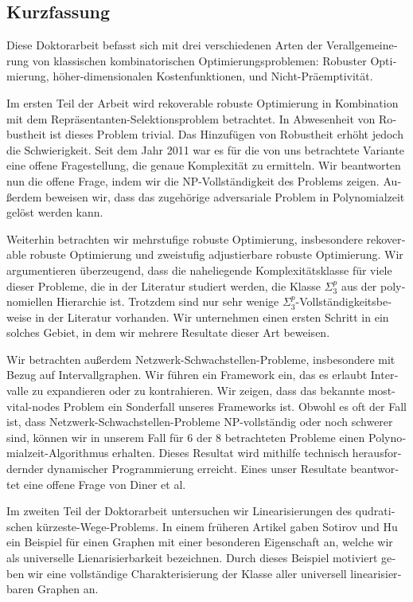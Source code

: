 \documentclass[twoside,openright,bibliography=totoc]{scrreprt}
\begin{document}
\begin{otherlanguage}{ngerman}
\chapter*{Kurzfassung}

Diese Doktorarbeit befasst sich mit drei verschiedenen Arten der Verallgemeinerung von klassischen kombinatorischen Optimierungsproblemen: Robuster Optimierung, höher-dimensionalen Kostenfunktionen, und Nicht-Präemptivität.


Im ersten Teil der Arbeit wird rekoverable robuste Optimierung in Kombination mit dem Repräsentanten-Selektionsproblem betrachtet. 
In Abwesenheit von Robustheit ist dieses Problem trivial. 
Das Hinzufügen von Robustheit erhöht jedoch die Schwierigkeit. 
Seit dem Jahr 2011 war es für die von uns betrachtete Variante eine offene Fragestellung, die genaue Komplexität zu ermitteln. Wir beantworten nun die offene Frage, indem wir die NP-Vollständigkeit des Problems zeigen.
Außerdem beweisen wir, dass das zugehörige adversariale Problem in Polynomialzeit gelöst werden kann. 

Weiterhin betrachten wir mehrstufige robuste Optimierung, insbesondere rekoverable robuste Optimierung und zweistufig adjustierbare robuste Optimierung. 
Wir argumentieren überzeugend, dass die naheliegende Komplexitätsklasse für viele dieser Probleme, die in der Literatur studiert werden, die Klasse $\Sigma^p_3$ aus der polynomiellen Hierarchie ist. Trotzdem sind nur sehr wenige $\Sigma^p_3$-Vollständigkeitsbeweise in der Literatur vorhanden. Wir unternehmen einen ersten Schritt in ein solches Gebiet, in dem wir mehrere Resultate dieser Art beweisen. 

Wir betrachten außerdem Netzwerk-Schwachstellen-Probleme, insbesondere mit Bezug auf Intervallgraphen. Wir führen ein Framework ein, das es erlaubt Intervalle zu expandieren oder zu kontrahieren. Wir zeigen, dass das bekannte most-vital-nodes Problem ein Sonderfall unseres Frameworks ist. Obwohl es oft der Fall ist, dass Netzwerk-Schwachstellen-Probleme NP-vollständig oder noch schwerer sind, können wir in unserem Fall für 6 der 8 betrachteten Probleme einen Polynomialzeit-Algorithmus erhalten. Dieses Resultat wird mithilfe technisch herausfordernder dynamischer Programmierung erreicht. Eines unser Resultate beantwortet eine offene Frage von Diner et al.


Im zweiten Teil der Doktorarbeit untersuchen wir Linearisierungen des qudratischen kürzeste-Wege-Problems. 
In einem früheren Artikel gaben Sotirov und Hu ein Beispiel für einen Graphen mit einer besonderen Eigenschaft an, welche wir als universelle Lienarisierbarkeit bezeichnen. 
Durch dieses Beispiel motiviert geben wir eine vollständige Charakterisierung der Klasse aller universell linearisierbaren Graphen an.


\end{otherlanguage}
\end{document}
